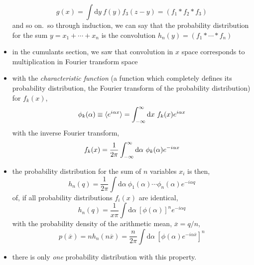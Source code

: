 \documentclass[../jaynes_prob_theory_notes.tex]{subfiles}
\begin{document}
\begin{itemize}
\begin{equation*}
                        g(x) = \int \mathrm{d}y~f(y)f_{3}(z-y) = (f_1 * f_2 * f_3)
                    \end{equation*}
                    and so on.\ so through induction, we can say that the probability distribution for the sum $y = x_1 + \cdots + x_n$ is the convolution $h_{n}(y) = (f_1 * \cdots * f_n)$
                \item in the cumulants section, we saw that convolution in $x$ space corresponds to multiplication in Fourier transform space
                \item with the \textit{characteristic function} (a function which completely defines its probability distribution, the Fourier transform of the probability distribution) for $f_{k}(x)$,
                    \begin{equation*}
                        {\phi}_{k}(\alpha) \equiv \langle e^{i{\alpha}x} \rangle = \int^{\infty}_{-\infty} \mathrm{d}x~f_{k}(x) e^{i{\alpha}x}
                    \end{equation*}
                    with the inverse Fourier transform,
                    \begin{equation*}
                        f_{k}(x) = \frac{1}{2\pi} \int^{\infty}_{-\infty} \mathrm{d}{\alpha}~{\phi}_{k}(\alpha) e^{-i{\alpha}x}
                    \end{equation*}
                \item the probability distribution for the sum of $n$ variables $x_i$ is then,
                    \begin{equation*}
                        h_{n}(q) = \frac{1}{2\pi} \int \mathrm{d}{\alpha}~{\phi}_{1}(\alpha) \cdots {\phi}_{n}(\alpha) e^{-i{\alpha}q}
                    \end{equation*}
                    of, if all probability distributions $f_{i}(x)$ are identical,
                    \begin{equation*}
                        h_{n}(q) = \frac{1}{x\pi} \int \mathrm{d}{\alpha}~{\left[ {\phi}(\alpha) \right]}^{n} e^{-i{\alpha}q}
                    \end{equation*}
                    with the probability density of the arithmetic mean, $\overline{x} = q/n$,
                    \begin{equation*}
                        p(\overline{x}) = nh_{n}(n\overline{x}) = \frac{n}{2\pi} \int \mathrm{d}{\alpha}~{\left[{\phi}(\alpha) e^{-i{\alpha}\overline{x}} \right]}^n
                    \end{equation*}
                \item there is only \textit{one} probability distribution with this property.

\end{itemize}
\end{document}
